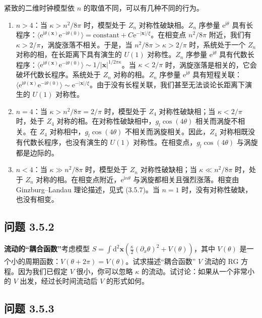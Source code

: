 紧致的二维时钟模型依 $n$ 的取值不同，可以有几种不同的行为。
\begin{enumerate}
\item $n > 4$：当 $\kappa > n^2/8\pi$ 时，模型处于 $Z_n$ 对称性破缺相。$Z_n$ 序参量 $\mathrm{e}^{\mathrm{i}\theta}$ 具有长程序：$\langle \mathrm{e}^{\mathrm{i}\theta(\pmb{x})}\mathrm{e}^{-\mathrm{i}\theta(0)}\rangle = \text{constant} + C\mathrm{e}^{-|\pmb{x}|/\xi}$。在相变点 $n^2/8\pi$ 附近，我们有 $\kappa > 2/\pi$，涡旋涨落不相关。于是，当 $n^2/8\pi > \kappa > 2/\pi$ 时，系统处于一个 $Z_n$ 对称的相，在长距离下具有演生的 $U(1)$ 对称性。$Z_n$ 序参量 $\mathrm{e}^{\mathrm{i}\theta}$ 具有代数长程序：$\langle \mathrm{e}^{\mathrm{i}\theta(\pmb{x})}\mathrm{e}^{-\mathrm{i}\theta(0)}\rangle \sim 1/|\pmb{x}|^{1/2\pi\kappa}$。当 $\kappa < 2/\pi$ 时，涡旋涨落是相关的，它会破坏代数长程序。系统处于 $Z_n$ 对称的相。$Z_n$ 序参量 $\mathrm{e}^{\mathrm{i}\theta}$ 具有短程关联：$\langle \mathrm{e}^{\mathrm{i}\theta(\pmb{x})}\mathrm{e}^{-\mathrm{i}\theta(0)}\rangle \sim \mathrm{e}^{-|\pmb{x}|/\xi}$。由于没有长程关联，我们甚至无法谈论长距离下演生的 $U(1)$ 对称性。
\item $n = 4$：当 $\kappa > n^2/8\pi = 2/\pi$ 时，模型处于 $Z_4$ 对称性破缺相；当 $\kappa < 2/\pi$ 时，处于 $Z_4$ 对称的相。在对称性破缺相中，$g_l\cos(4\theta)$ 相关而涡旋不相关。在 $Z_4$ 对称相中，$g_l\cos(4\theta)$ 不相关而涡旋相关。因此，$Z_4$ 对称相既没有代数长程序，也没有演生的 $U(1)$ 对称性。在相变点，$g_l\cos(4\theta)$ 与涡旋都是边际的。
\item $n < 4$：当 $\kappa \gg n^2/8\pi$ 时，模型处于 $Z_n$ 对称性破缺相；当 $\kappa \ll n^2/8\pi$ 时，处于 $Z_n$ 对称的相。在相变点附近，$\mathrm{e}^{\mathrm{i}n\theta}$ 与涡旋都相关且强烈涨落。相变由 Ginzburg–Landau 理论描述，见式 (3.5.7)。当 $n = 1$ 时，没有对称性破缺，也没有相变。
\end{enumerate}

\subsection*{问题 3.5.2}

\textbf{流动的“耦合函数”}\quad 考虑模型 $S = \int \mathrm{d}^2\pmb{x}\left(\frac{\kappa}{2}(\partial_x\theta)^2 + V(\theta)\right)$，其中 $V(\theta)$ 是一个小的周期函数：$V(\theta + 2\pi) = V(\theta)$。试求描述“耦合函数” $V$ 流动的 RG 方程。因为我们已假定 $V$ 很小，你可以忽略 $\kappa$ 的流动。试讨论：如果从一个非常小的 $V$ 出发，经过长时间流动后 $V$ 的形式如何。

\subsection*{问题 3.5.3}

